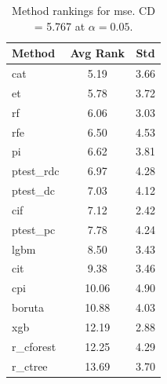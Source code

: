 \begin{table}[h]
\centering
\caption{Method rankings for mse. CD = 5.767 at $\alpha=0.05$.}
\label{tab:ranks_mse}
\begin{tabular}{lcc}
\toprule
Method & Avg Rank & Std \\
\midrule
cat & 5.19 & 3.66 \\
et & 5.78 & 3.72 \\
rf & 6.06 & 3.03 \\
rfe & 6.50 & 4.53 \\
pi & 6.62 & 3.81 \\
ptest_rdc & 6.97 & 4.28 \\
ptest_dc & 7.03 & 4.12 \\
cif & 7.12 & 2.42 \\
ptest_pc & 7.78 & 4.24 \\
lgbm & 8.50 & 3.43 \\
cit & 9.38 & 3.46 \\
cpi & 10.06 & 4.90 \\
boruta & 10.88 & 4.03 \\
xgb & 12.19 & 2.88 \\
r_cforest & 12.25 & 4.29 \\
r_ctree & 13.69 & 3.70 \\
\bottomrule
\end{tabular}
\end{table}